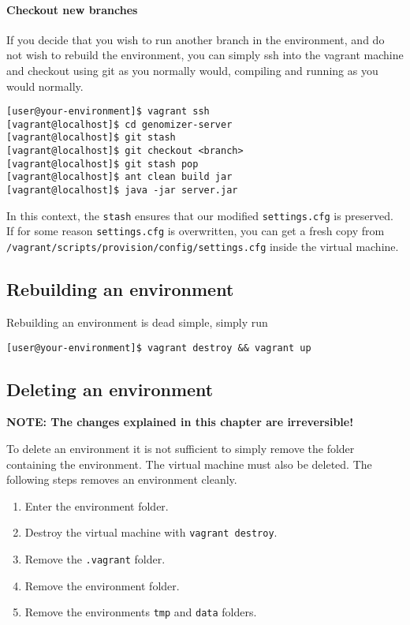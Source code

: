 \paragraph{Checkout new branches}\label{checkout-new-branches}

If you decide that you wish to run another branch in the environment,
and do not wish to rebuild the environment, you can simply ssh into the
vagrant machine and checkout using git as you normally would, compiling
and running as you would normally.

\begin{verbatim}
[user@your-environment]$ vagrant ssh
[vagrant@localhost]$ cd genomizer-server
[vagrant@localhost]$ git stash
[vagrant@localhost]$ git checkout <branch>
[vagrant@localhost]$ git stash pop
[vagrant@localhost]$ ant clean build jar
[vagrant@localhost]$ java -jar server.jar
\end{verbatim}

In this context, the \texttt{stash} ensures that our modified
\texttt{settings.cfg} is preserved. If for some reason
\texttt{settings.cfg} is overwritten, you can get a fresh copy from
\texttt{/vagrant/scripts/provision/config/settings.cfg} inside the
virtual machine.

\subsection{Rebuilding an environment}\label{rebuilding-an-environment}

Rebuilding an environment is dead simple, simply run

\begin{verbatim}
[user@your-environment]$ vagrant destroy && vagrant up
\end{verbatim}

\subsection{Deleting an environment}\label{deleting-an-environment}

\textbf{NOTE: The changes explained in this chapter are irreversible!}

To delete an environment it is not sufficient to simply remove the
folder containing the environment. The virtual machine must also be
deleted. The following steps removes an environment cleanly.

\begin{enumerate}
\itemsep1pt\parskip0pt
\item
  Enter the environment folder.
\item
  Destroy the virtual machine with \texttt{vagrant\ destroy}.
\item
  Remove the \texttt{.vagrant} folder.
\item
  Remove the environment folder.
\item
  Remove the environments \texttt{tmp} and \texttt{data} folders.
\end{enumerate}

